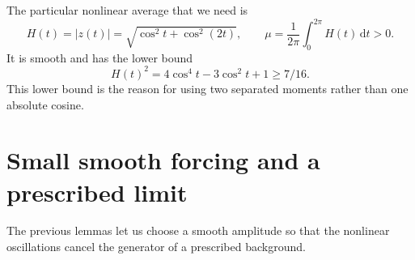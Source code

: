\documentclass[11pt]{article}
\newcommand{\dd}{\,\mathrm d}
\theoremstyle{remark}
\numberwithin{equation}{section}
\begin{document}
The particular nonlinear average that we need is
\begin{equation}\label{eq:H}
 H(t)=|z(t)|=\sqrt{\cos^2t+\cos^2(2t)},\qquad
 \mu=\frac1{2\pi}\int_0^{2\pi}H(t)\dd t>0.
\end{equation}
It is smooth and has the lower bound
\begin{equation}\label{eq:Hlower}
 H(t)^2=4\cos^4t-3\cos^2t+1\ge7/16.
\end{equation}
This lower bound is the reason for using two separated moments rather
than one absolute cosine.

\section{Small smooth forcing and a prescribed limit}\label{sec:limits}
The previous lemmas let us choose a smooth amplitude so that the
nonlinear oscillations cancel the generator of a prescribed background.
\end{document}
